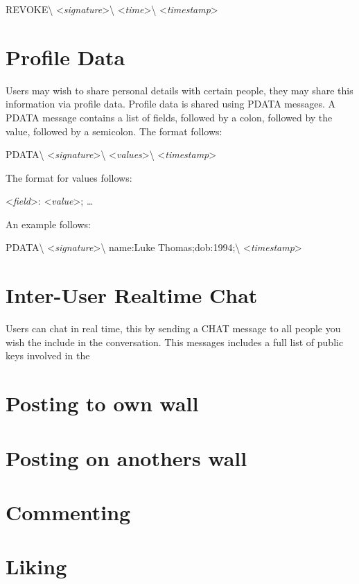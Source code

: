 \begin{center}
REVOKE\textbackslash
\textless \textit{signature}\textgreater\textbackslash
\textless \textit{time}\textgreater\textbackslash
\textless \textit{timestamp}\textgreater
\end{center}

\section{Profile Data}
Users may wish to share personal details with certain people, they may share
this information via profile data. Profile data is shared using PDATA messages.
A PDATA message contains a list of fields, followed by a colon, followed by the
value, followed by a semicolon. The format follows:

\begin{center}
PDATA\textbackslash
\textless \textit{signature}\textgreater\textbackslash
\textless \textit{values}\textgreater\textbackslash
\textless \textit{timestamp}\textgreater
\end{center}

The format for values follows:

\begin{center}
\textless \textit{field}\textgreater:
\textless \textit{value}\textgreater;
\ldots
\end{center}

An example follows:

\begin{center}
PDATA\textbackslash
\textless \textit{signature}\textgreater\textbackslash
name:Luke Thomas;dob:1994;\textbackslash
\textless \textit{timestamp}\textgreater
\end{center}

\section{Inter-User Realtime Chat}
Users can chat in real time, this by sending a CHAT message to all people you
wish the include in the conversation. This messages includes a full list of
public keys involved in the 

\section{Posting to own wall}

\section{Posting on anothers wall}

\section{Commenting}

\section{Liking}
